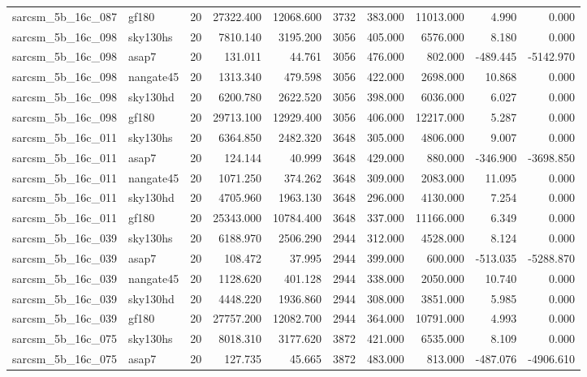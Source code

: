\documentclass{article}
\begin{document}
\begin{longtable}{llrrrrrrrr}
sarcsm\_5b\_16c\_087 & gf180 & 20 & 27322.400 & 12068.600 & 3732 & 383.000 & 11013.000 & 4.990 & 0.000 \\
sarcsm\_5b\_16c\_098 & sky130hs & 20 & 7810.140 & 3195.200 & 3056 & 405.000 & 6576.000 & 8.180 & 0.000 \\
sarcsm\_5b\_16c\_098 & asap7 & 20 & 131.011 & 44.761 & 3056 & 476.000 & 802.000 & -489.445 & -5142.970 \\
sarcsm\_5b\_16c\_098 & nangate45 & 20 & 1313.340 & 479.598 & 3056 & 422.000 & 2698.000 & 10.868 & 0.000 \\
sarcsm\_5b\_16c\_098 & sky130hd & 20 & 6200.780 & 2622.520 & 3056 & 398.000 & 6036.000 & 6.027 & 0.000 \\
sarcsm\_5b\_16c\_098 & gf180 & 20 & 29713.100 & 12929.400 & 3056 & 406.000 & 12217.000 & 5.287 & 0.000 \\
sarcsm\_5b\_16c\_011 & sky130hs & 20 & 6364.850 & 2482.320 & 3648 & 305.000 & 4806.000 & 9.007 & 0.000 \\
sarcsm\_5b\_16c\_011 & asap7 & 20 & 124.144 & 40.999 & 3648 & 429.000 & 880.000 & -346.900 & -3698.850 \\
sarcsm\_5b\_16c\_011 & nangate45 & 20 & 1071.250 & 374.262 & 3648 & 309.000 & 2083.000 & 11.095 & 0.000 \\
sarcsm\_5b\_16c\_011 & sky130hd & 20 & 4705.960 & 1963.130 & 3648 & 296.000 & 4130.000 & 7.254 & 0.000 \\
sarcsm\_5b\_16c\_011 & gf180 & 20 & 25343.000 & 10784.400 & 3648 & 337.000 & 11166.000 & 6.349 & 0.000 \\
sarcsm\_5b\_16c\_039 & sky130hs & 20 & 6188.970 & 2506.290 & 2944 & 312.000 & 4528.000 & 8.124 & 0.000 \\
sarcsm\_5b\_16c\_039 & asap7 & 20 & 108.472 & 37.995 & 2944 & 399.000 & 600.000 & -513.035 & -5288.870 \\
sarcsm\_5b\_16c\_039 & nangate45 & 20 & 1128.620 & 401.128 & 2944 & 338.000 & 2050.000 & 10.740 & 0.000 \\
sarcsm\_5b\_16c\_039 & sky130hd & 20 & 4448.220 & 1936.860 & 2944 & 308.000 & 3851.000 & 5.985 & 0.000 \\
sarcsm\_5b\_16c\_039 & gf180 & 20 & 27757.200 & 12082.700 & 2944 & 364.000 & 10791.000 & 4.993 & 0.000 \\
sarcsm\_5b\_16c\_075 & sky130hs & 20 & 8018.310 & 3177.620 & 3872 & 421.000 & 6535.000 & 8.109 & 0.000 \\
sarcsm\_5b\_16c\_075 & asap7 & 20 & 127.735 & 45.665 & 3872 & 483.000 & 813.000 & -487.076 & -4906.610 \\

\end{longtable}
\end{document}

